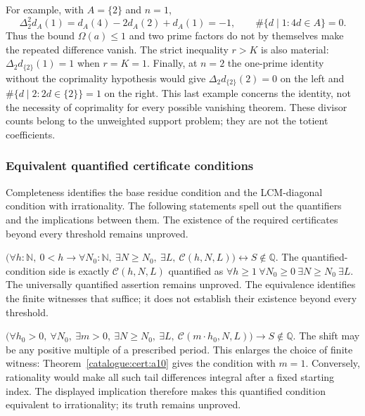 For example, with $A=\{2\}$ and $n=1$,
\[
 \Delta_2^2d_A(1)=d_A(4)-2d_A(2)+d_A(1)=-1,
 \qquad \#\{d\mid1:4d\in A\}=0.
\]
Thus the bound $\Omega(a)\le1$ and two prime factors do not by themselves
make the repeated difference vanish. The strict inequality $r>K$ is
also material: $\Delta_2d_{\{2\}}(1)=1$ when $r=K=1$.
Finally, at $n=2$ the one-prime identity without the coprimality hypothesis
would give $\Delta_2d_{\{2\}}(2)=0$ on the left and
$\#\{d\mid2:2d\in\{2\}\}=1$ on the right.
This last example concerns the identity, not the necessity of coprimality
for every possible vanishing theorem. These divisor counts belong to
the unweighted support problem; they are not the totient coefficients.

\subsubsection{Equivalent quantified certificate conditions}

Completeness identifies the base residue condition and the LCM-diagonal
condition with irrationality. The following statements spell out the
quantifiers and the implications between them. The existence of the
required certificates beyond every threshold remains unproved.

\begin{thm}\label{catalogue:cert:a10}
$\big(\forall h:\mathbb{N},\ 0<h \to \forall N_0:\mathbb{N},\ \exists N\ge N_0,\ \exists L,\ \mathcal{C}(h,N,L)\big) \leftrightarrow S\notin\mathbb Q$. The quantified-condition side is exactly $\mathcal{C}(h,N,L)$ quantified as $\forall h\ge1\ \forall N_0\ge0\ \exists N\ge N_0\ \exists L$. The universally quantified assertion remains unproved. The equivalence identifies the finite witnesses that suffice; it does not establish their existence beyond every threshold.
\end{thm}

\begin{thm}\label{catalogue:cert:b2}
$\big(\forall h_0>0,\ \forall N_0,\ \exists m>0,\ \exists N\ge N_0,\ \exists L,\ \mathcal{C}(m\cdot h_0, N, L)\big) \to S\notin\mathbb Q$. The shift may be any positive multiple of a prescribed period. This
enlarges the choice of finite witness: Theorem~\ref{catalogue:cert:a10}
gives the condition with $m=1$. Conversely, rationality would make all
such tail differences integral after a fixed starting index. The
displayed implication therefore makes this quantified condition
equivalent to irrationality; its truth remains unproved.
\end{thm}

